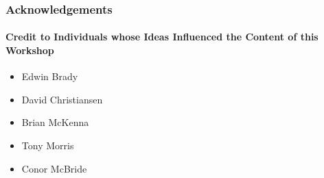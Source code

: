 \begin{frame}[fragile]
\frametitle{Acknowledgements}
\framesubtitle{Credit to Individuals whose Ideas Influenced the Content of this Workshop}

\begin{itemize}
\item Edwin Brady
\item David Christiansen
\item Brian McKenna
\item Tony Morris
\item Conor McBride
\end{itemize}

\end{frame}
